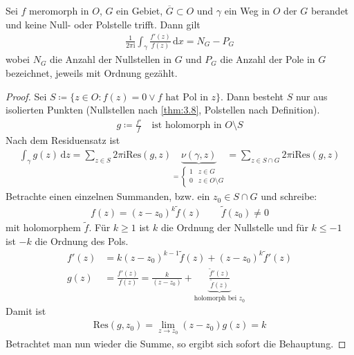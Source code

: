 \documentclass[a4paper,10pt]{scrbook}
\begin{document}
\begin{theorem} \label{thm:4.21}
  Sei $f$ meromorph in $O$, $G$ ein Gebiet, $\overline{G} \subset O$ und $\gamma$ ein Weg in $O$ der $G$ berandet und keine Null- oder Polstelle trifft. Dann gilt
  \begin{align*}
    \frac{1}{2\pi \mathrm{i}} \int_\gamma \frac{f'(z)}{f(z)} \, \mathrm{d}x = N_G - P_G
  \end{align*}
  wobei $N_G$ die Anzahl der Nullstellen in $G$ und $P_G$ die Anzahl der Pole in $G$ bezeichnet, jeweils mit Ordnung gezählt.

  \begin{proof}
    Sei $S \coloneq \{ z \in O : f(z) = 0 \lor f\text{ hat Pol in }z \}$.
    Dann besteht $S$ nur aus isolierten Punkten (Nullstellen nach \ref{thm:3.8}, Polstellen nach Definition).
    \begin{align*}
      g \coloneq \frac{f'}{f} \quad \text{ist holomorph in $O \setminus S$}
    \end{align*}
    Nach dem Residuensatz ist
    \begin{align*}
      \int_\gamma g(z) \, \mathrm dz = \sum_{z \in S} 2 \pi \mathrm{i} \mathrm{Res}(g,z) \underbrace{\nu(\gamma,z)}_{= \begin{cases} 1 & z \in G \\ 0 & z \in O \setminus G \end{cases}} = \sum_{z \in S \cap G} 2 \pi \mathrm{i} \mathrm{Res}(g,z)
    \end{align*}
    Betrachte einen einzelnen Summanden, bzw. ein $z_0 \in S \cap G$ und schreibe:
    \begin{align*}
      f(z) = (z-z_0)^k \widetilde{f}(z) \qquad \widetilde{f}(z_0) \neq 0
    \end{align*}
    mit holomorphem $\widetilde{f}$.
    Für $k\ge 1$ ist $k$ die Ordnung der Nullstelle und für $k \le -1$ ist $-k$ die Ordnung des Pols.
    \begin{align*}
      f'(z) &= k (z-z_0)^{k-1} \widetilde{f}(z) + (z-z_0)^k \widetilde{f}'(z) \\
      g(z) &= \frac{f'(z)}{f(z)} = \frac{k}{(z-z_0)} + \underbrace{\frac{\widetilde{f}'(z)}{\widetilde{f}(z)}}_{\text{holomorph bei $z_0$}}
    \end{align*}
    Damit ist
    \begin{align*}
      \mathrm{Res}(g,z_0) = \lim\limits_{z \to z_0} (z-z_0) g(z) = k
    \end{align*}
    Betrachtet man nun wieder die Summe, so ergibt sich sofort die Behauptung.
  \end{proof}
\end{theorem}
\end{document}
